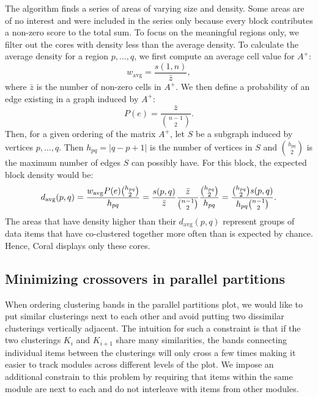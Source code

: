 \documentclass[12pt]{cmuthesis}
\newcommand\Coral{Coral\xspace}
\begin{document}

  The algorithm finds a series of areas of varying size and density. Some areas are of no interest and were included in the series only because every block contributes a non-zero score to the total sum. To focus on the meaningful regions only, we filter out the cores with density less than the average density. To calculate the average density for a region $p, \ldots, q$, we first compute an average cell value for $A^{+}$:
  \[
  w_{\textrm{avg}} = \frac{ s(1, n) } { \bar{z} },
  \]
  where $\bar{z}$ is the number of non-zero cells in $A^{+}$. We then define a probability of an edge existing in a graph induced by $A^{+}$: 
  \[
  P(e) = \frac{\bar{z}}{ {n-1 \choose 2} }.
  \]
  Then, for a given ordering of the matrix $A^{+}$, let $S$ be a subgraph induced by vertices $p, \ldots, q$. Then $h_{pq} = |q-p+1|$ is the number of vertices in $S$ and $h_{pq} \choose 2$ is the maximum number of edges $S$ can possibly have. For this block, the expected block density would be:
  \begin{align*}
  d_{\textrm{\scriptsize avg}}(p, q) =
    \frac{w_{\textrm{avg}} P(e) {h_{pq} \choose 2} }{h_{pq}} =
    \frac{ s(p,q) } { \bar{z} }
          \frac{ \bar{z} }{ {n-1 \choose 2} }
          \frac{ {h_{pq} \choose 2} }{ h_{pq}}
    = \frac{ {h_{pq} \choose 2} s(p,q)}{ h_{pq} {n-1 \choose 2} }.
  \end{align*}
  The areas that have density higher than their $d_{\textrm{avg}}(p,q)$ represent groups of data items that have co-clustered together more often than is expected by chance. Hence, \Coral displays only these cores.

  \subsection{Minimizing crossovers in parallel partitions}

  When ordering clustering bands in the parallel partitions plot, we would like to put similar clusterings next to each other and avoid putting two dissimilar clusterings vertically adjacent. The intuition for such a constraint is that if the two clusterings $K_{i}$ and $K_{i+1}$ share many similarities, the bands connecting individual items between the clusterings will only cross a few times making it easier to track modules across different levels of the plot. We impose an additional constrain to this problem by requiring that items within the same module are next to each and do not interleave with items from other modules.
\end{document}
